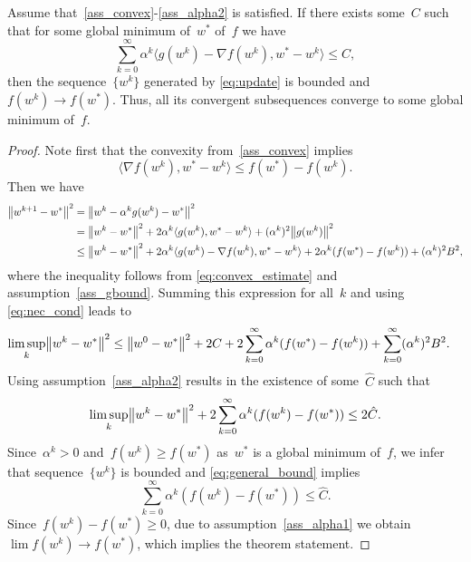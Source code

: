 \begin{theorem}\label{thm:convergence}
  Assume that~\ref{ass_convex}-\ref{ass_alpha2} is satisfied. If there exists some~$C$ such that for some global minimum of~$w^*$ of~$f$ we have
  \begin{equation}\label{eq:nec_cond}
    \sum_{k=0}^\infty\alpha^k\langle g(w^k)-\nabla f(w^k),w^*-w^k\rangle\le C,
  \end{equation}
  then the sequence~$\{w^k\}$ generated by \eqref{eq:update} is bounded and~$f(w^k)\to f(w^*)$. Thus, all its convergent subsequences converge to some global minimum of~$f$.
\end{theorem}
\begin{proof}
  Note first that the convexity from~\ref{ass_convex} implies
  \begin{equation}\label{eq:convex_estimate}
    \langle \nabla f(w^k),w^*-w^k\rangle\le f(w^*)-f(w^k).
  \end{equation}
  Then we have
  $$
  \begin{aligned}
  \norm{w^{k+1}-w^*}^2 &= \norm{w^k-\alpha^kg(w^k)-w^*}^2 \\
  &=\norm{w^k-w^*}^2 + 2\alpha^k\langle g(w^k),w^*-w^k\rangle + (\alpha^k)^2\norm{g(w^k)}^2 \\
  &\le \norm{w^k-w^*}^2 + 2\alpha^k\langle g(w^k)-\nabla f(w^k),w^*-w^k\rangle + 2\alpha^k(f(w^*)-f(w^k)) + (\alpha^k)^2B^2,
  \end{aligned}
  $$
  where the inequality follows from \eqref{eq:convex_estimate} and assumption~\ref{ass_gbound}. Summing this expression for all~$k$ and using \eqref{eq:nec_cond} leads to
  $$
  \begin{aligned}
  \limsup_k\norm{w^k-w^*}^2 &\le \norm{w^0-w^*}^2 +2C + 2\sum_{k=0}^\infty\alpha^k(f(w^*)-f(w^k)) + \sum_{k=0}^\infty(\alpha^k)^2B^2.
  \end{aligned}
  $$
  Using assumption~\ref{ass_alpha2} results in the existence of some~$\hat C$ such that
  \begin{equation}\label{eq:general_bound}
  \limsup_k\norm{w^k-w^*}^2 + 2\sum_{k=0}^\infty\alpha^k(f(w^k) - f(w^*)) \le 2\hat C.
  \end{equation}
  Since~$\alpha^k>0$ and~$f(w^k)\ge f(w^*)$ as~$w^*$ is a global minimum of~$f$, we infer that sequence~$\{w^k\}$ is bounded and \eqref{eq:general_bound} implies
  $$
  \sum_{k=0}^\infty\alpha^k(f(w^k) - f(w^*)) \le \hat C.
  $$
  Since~$f(w^k)-f(w^*)\ge 0$, due to assumption~\ref{ass_alpha1} we obtain~$\lim f(w^k)\to f(w^*)$, which implies the theorem statement.
\end{proof}

